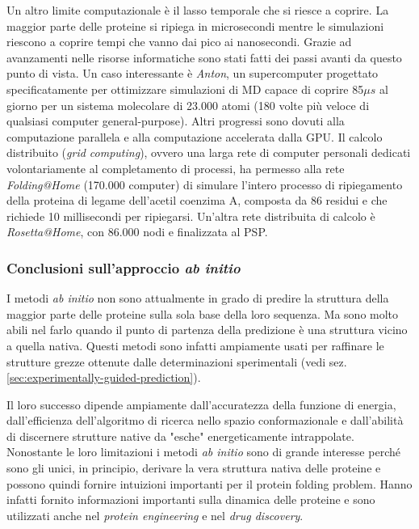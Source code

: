 {\par Un altro limite computazionale è il lasso temporale che si riesce a coprire. La maggior parte delle proteine si ripiega in microsecondi mentre le simulazioni riescono a coprire tempi che vanno dai pico ai nanosecondi. Grazie ad avanzamenti nelle risorse informatiche sono stati fatti dei passi avanti da questo punto di vista. Un caso interessante è \textit{Anton}, un supercomputer progettato specificatamente per ottimizzare simulazioni di MD capace di coprire 85$\mu s$ al giorno per un sistema molecolare di 23.000 atomi (180 volte più veloce di qualsiasi computer general-purpose). Altri progressi sono dovuti alla computazione parallela e alla computazione accelerata dalla GPU. Il calcolo distribuito (\textit{grid computing}), ovvero una larga rete di computer personali dedicati volontariamente al completamento di processi, ha permesso alla rete \textit{Folding@Home} (170.000 computer) di simulare l'intero processo di ripiegamento della proteina di legame dell'acetil coenzima A, composta da 86 residui e che richiede 10 millisecondi per ripiegarsi. Un'altra rete distribuita di calcolo è \textit{Rosetta@Home}, con 86.000 nodi e finalizzata al PSP. \\

\subsubsection{Conclusioni sull'approccio \textit{ab initio}}
I metodi \textit{ab initio} non sono attualmente in grado di predire la struttura della maggior parte delle proteine sulla sola base della loro sequenza. Ma sono molto abili nel farlo quando il punto di partenza della predizione è una struttura vicino a quella nativa. Questi metodi sono infatti ampiamente usati per raffinare le strutture grezze ottenute dalle determinazioni sperimentali (vedi sez. \ref{sec:experimentally-guided-prediction}). 

\par Il loro successo dipende ampiamente dall'accuratezza della funzione di energia, dall'efficienza dell'algoritmo di ricerca nello spazio conformazionale e dall'abilità di discernere strutture native da "esche" energeticamente intrappolate.
Nonostante le loro limitazioni i metodi \textit{ab initio} sono di grande interesse perché sono gli unici, in principio, derivare la vera struttura nativa delle proteine e possono quindi fornire intuizioni importanti per il protein folding problem. Hanno infatti fornito informazioni importanti sulla dinamica delle proteine e sono utilizzati anche nel \textit{protein engineering} e nel \textit{drug discovery}. 

}

